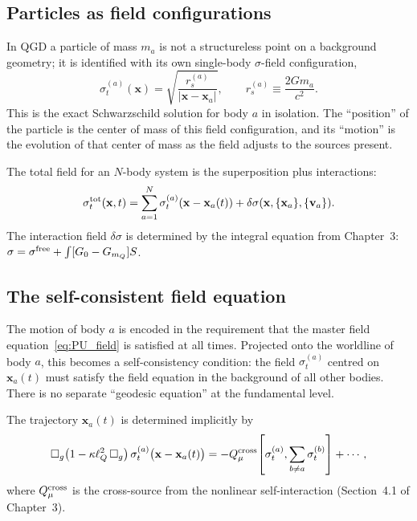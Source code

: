 \documentclass[11pt,a4paper]{article}
\theoremstyle{plain}
\theoremstyle{definition}
\theoremstyle{remark}
\newcommand{\sigt}{\sigma_t}
\newcommand{\lQ}{\ell_Q}
\newcommand{\mQ}{m_Q}
\newcommand{\boxg}{\square_g}
\begin{document}
\subsection{Particles as field configurations}

In QGD a particle of mass $m_a$ is not a structureless point on a background
geometry; it is identified with its own single-body $\sigma$-field configuration,
\begin{equation}
  \sigt^{(a)}(\mathbf{x}) = \sqrt{\frac{r_s^{(a)}}{|\mathbf{x} - \mathbf{x}_a|}},
  \qquad r_s^{(a)} \equiv \frac{2Gm_a}{c^2}.
  \label{eq:single_body_field}
\end{equation}
This is the exact Schwarzschild solution for body $a$ in isolation.  The ``position''
of the particle is the center of mass of this field configuration, and its ``motion''
is the evolution of that center of mass as the field adjusts to the sources present.

The total field for an $N$-body system is the superposition plus interactions:
\begin{equation}
  \sigt^{\rm tot}(\mathbf{x},t)
  = \sum_{a=1}^N \sigt^{(a)}(\mathbf{x}-\mathbf{x}_a(t))
    + \delta\sigma(\mathbf{x},\{\mathbf{x}_a\},\{\mathbf{v}_a\}).
\end{equation}
The interaction field $\delta\sigma$ is determined by the integral equation from
Chapter~3: $\sigma = \sigma^{\rm free} + \int[G_0 - G_{\mQ}]S$.

\subsection{The self-consistent field equation}

The motion of body $a$ is encoded in the requirement that the master field
equation~\eqref{eq:PU_field} is satisfied at all times.  Projected onto the worldline
of body $a$, this becomes a self-consistency condition: the field $\sigt^{(a)}$ centred
on $\mathbf{x}_a(t)$ must satisfy the field equation in the background of all other
bodies.  There is no separate ``geodesic equation'' at the fundamental level.

The trajectory $\mathbf{x}_a(t)$ is determined implicitly by
\begin{equation}
  \boxg\!\left(1 - \kappa\lQ^2\,\boxg\right)
  \sigt^{(a)}\bigl(\mathbf{x} - \mathbf{x}_a(t)\bigr)
  = -Q_\mu^{\rm cross}\!\left[\sigt^{(a)}, \sum_{b\neq a}\sigt^{(b)}\right] + \cdots,
  \label{eq:self_consistent}
\end{equation}
where $Q_\mu^{\rm cross}$ is the cross-source from the nonlinear self-interaction
(Section~4.1 of Chapter~3).
\end{document}
